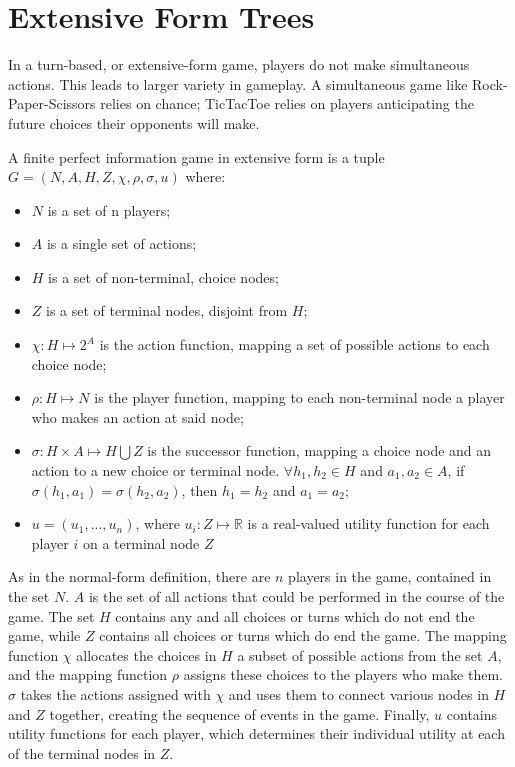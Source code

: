 \section{Extensive Form Trees}
In a turn-based, or extensive-form game, players do not make simultaneous actions. This leads to larger variety in gameplay. A simultaneous game like Rock-Paper-Scissors relies on chance; TicTacToe relies on players anticipating the future choices their opponents will make.\\

\begin{define}
  A finite perfect information game in extensive form is a tuple $G = (N, A, H, Z, \chi, \rho, \sigma, u)$ where:
  \begin{itemize}
  \item $N$ is a set of n players;
  \item $A$ is a single set of actions;
  \item $H$ is a set of non-terminal, choice nodes;
  \item $Z$ is a set of terminal nodes, disjoint from $H$;
  \item $\chi: H\mapsto 2^A$ is the action function, mapping a set of possible actions to each choice node;
  \item $\rho: H\mapsto N$ is the player function, mapping to each non-terminal node a player who makes an action at said node;
  \item $\sigma: H\times A\mapsto H\bigcup Z$ is the successor function, mapping a choice node and an action to a new choice or terminal node. $\forall h_1, h_2\in H$ and $a_1, a_2\in A$, if $\sigma(h_1, a_1)=\sigma(h_2, a_2)$, then $h_1=h_2$ and $a_1=a_2$;
  \item $u=(u_1,...,u_n)$, where $u_i:Z\mapsto \mathbb{R}$ is a real-valued utility function for each player $i$ on a terminal node $Z$
  \end{itemize}
\end{define}

As in the normal-form definition, there are $n$ players in the game, contained in the set $N$. $A$ is the set of all actions that could be performed in the course of the game. The set $H$ contains any and all choices or turns which do not end the game, while $Z$ contains all choices or turns which do end the game. The mapping function $\chi$ allocates the choices in $H$ a subset of possible actions from the set $A$, and the mapping function $\rho$ assigns these choices to the players who make them. $\sigma$ takes the actions assigned with $\chi$ and uses them to connect various nodes in $H$ and $Z$ together, creating the sequence of events in the game. Finally, $u$ contains utility functions for each player, which determines their individual utility at each of the terminal nodes in $Z$.\\

